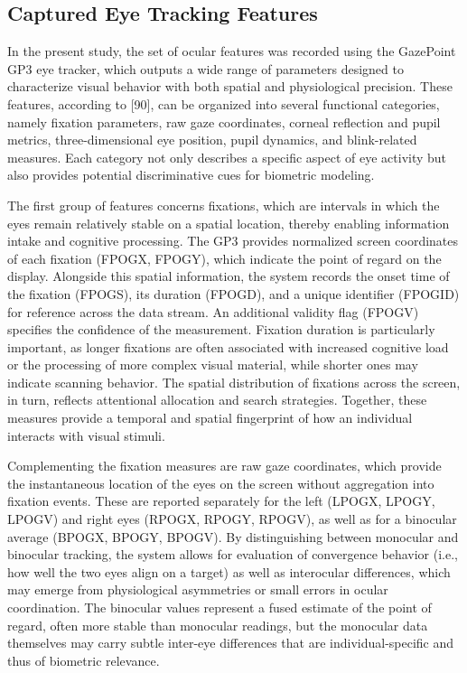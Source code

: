 \documentclass{article}
\begin{document}
\newpage

\subsection{Captured Eye Tracking Features}

In the present study, the set of ocular features was recorded using the GazePoint GP3 eye tracker, which outputs a wide range of parameters designed to characterize visual behavior with both spatial and physiological precision. 
These features, according to [90], can be organized into several functional categories, namely fixation parameters, raw gaze coordinates, corneal reflection and pupil metrics, three-dimensional eye position, pupil dynamics, and blink-related measures. 
Each category not only describes a specific aspect of eye activity but also provides potential discriminative cues for biometric modeling.

The first group of features concerns fixations, which are intervals in which the eyes remain relatively stable on a spatial location, thereby enabling information intake and cognitive processing. 
The GP3 provides normalized screen coordinates of each fixation (FPOGX, FPOGY), which indicate the point of regard on the display. 
Alongside this spatial information, the system records the onset time of the fixation (FPOGS), its duration (FPOGD), and a unique identifier (FPOGID) for reference across the data stream. 
An additional validity flag (FPOGV) specifies the confidence of the measurement. 
Fixation duration is particularly important, as longer fixations are often associated with increased cognitive load or the processing of more complex visual material, while shorter ones may indicate scanning behavior. 
The spatial distribution of fixations across the screen, in turn, reflects attentional allocation and search strategies. 
Together, these measures provide a temporal and spatial fingerprint of how an individual interacts with visual stimuli.

Complementing the fixation measures are raw gaze coordinates, which provide the instantaneous location of the eyes on the screen without aggregation into fixation events. 
These are reported separately for the left (LPOGX, LPOGY, LPOGV) and right eyes (RPOGX, RPOGY, RPOGV), as well as for a binocular average (BPOGX, BPOGY, BPOGV). 
By distinguishing between monocular and binocular tracking, the system allows for evaluation of convergence behavior (i.e., how well the two eyes align on a target) as well as interocular differences, which may emerge from physiological asymmetries or small errors in ocular coordination. 
The binocular values represent a fused estimate of the point of regard, often more stable than monocular readings, but the monocular data themselves may carry subtle inter-eye differences that are individual-specific and thus of biometric relevance.
\end{document}
